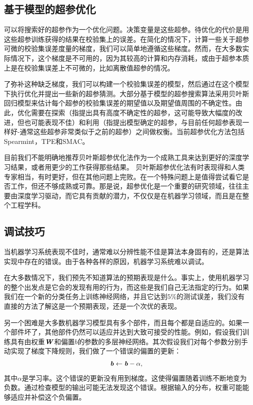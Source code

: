 \subsection{基于模型的超参优化}
\label{sec:11.4.5}

可以将搜索好的超参作为一个优化问题。决策变量是这些超参。待优化的代价是用这些超参训练获得的结果在校验集上的误差。在简化的情况下，计算一些关于超参可微的校验集误差度量的梯度，我们可以简单地遵循这些梯度。然而，在大多数实际情况下，这个梯度是不可用的，因为其较高的计算和内存消耗，或由于超参本质上是在校验集误差上不可微的，比如离散值超参的情况。

了弥补这种缺乏梯度，我们可以构建一个校验集误差的模型，然后通过在这个模型下执行优化并提出一些新的超参猜测。大部分基于模型的超参搜索算法采用贝叶斯回归模型来估计每个超参的校验集误差的期望值以及期望值周围的不确定性。由此，优化需要在探索（指提出具有高度不确定性的超参，这可能导致大幅度的改进，但也可能表现不佳）和利用（指提出模型确定的超参，与目前任何超参表现一样好-通常这些超参非常类似于之前的超参）之间做权衡。当前超参优化方法包括Spearmint，TPE和SMAC。

目前我们不能明确地推荐贝叶斯超参优化法作为一个成熟工具来达到更好的深度学习结果，或者用更少的工作获得那些结果。 贝叶斯超参优化法有时表现得和人类专家相当，有时更好，但在其他问题上完败。在一个特殊问题上是值得尝试看它是否工作，但还不够成熟或可靠。那是说，超参优化是一个重要的研究领域，往往主要由深度学习驱动，而它具有贡献的潜力，不仅仅是在机器学习领域，而且是在整个工程学科。

\subsection{调试技巧}
\label{sec:11.5}

当机器学习系统表现不佳时，通常难以分辨性能不佳是算法本身固有的，还是算法实现中存在的错误。由于各种各样的原因，机器学习系统难以调试。

在大多数情况下，我们预先不知道算法的预期表现是什么。事实上，使用机器学习的整个出发点是它会的发现有用的行为，而这些是我们自己无法指定的行为。如果我们在一个新的分类任务上训练神经网络，并且它达到$5\%$的测试误差，我们没有直接的方法了解这是一个预期表现，还是一个次优的表现。

另一个困难是大多数机器学习模型具有多个部件，而且每个都是自适应的。如果一个部件坏了，其他部件仍然可以适应并达到大致可接受的性能。例如，假设我们训练具有由权重$\boldsymbol{\mathit{W}}$和偏置$b$的参数的多层神经网络。其次假设我们对每个参数分别手动实现了梯度下降规则，我们做了一个错误的偏置的更新：
\begin{equation}
    \boldsymbol{\mathit{b}} \leftarrow \boldsymbol{\mathit{b}} - \alpha,
\end{equation}
其中$\alpha$是学习率。这个错误的更新没有用到梯度。这使得偏置随着训练不断地变为负数。通过检查模型的输出可能无法发现这个错误。根据输入的分布，权重可能能够适应并补偿这个负偏置。

